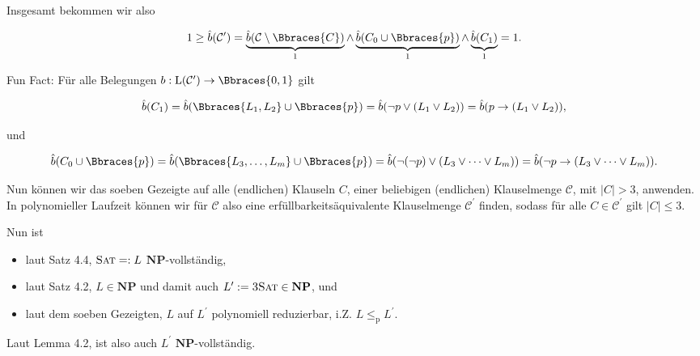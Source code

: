 \begin{solution}
\begin{enumerate}[label = \arabic*.]
\end{enumerate}

Insgesamt bekommen wir also

\begin{align*}
    1
    \geq
    \hat b(\mathcal C^\prime)
    =
    \underbrace{\hat b(\mathcal C \setminus \Bbraces{C})}_1
    \land
    \underbrace{\hat b(C_0 \cup \Bbraces{p})}_1
    \land
    \underbrace{\hat b(C_1)}_1
    =
    1.
\end{align*}

Fun Fact:
Für alle Belegungen $b: \operatorname L(\mathcal C^\prime) \to \Bbraces{0, 1}$ gilt

\begin{align*}
    \hat b(C_1)
    =
    \hat b(\Bbraces{L_1, L_2} \cup \Bbraces{p})
    =
    \hat b(\neg p \lor (L_1 \lor L_2))
    =
    \hat b(p \to (L_1 \lor L_2)),
\end{align*}

und

\begin{align*}
    \hat b(C_0 \cup \Bbraces{p})
    =
    \hat b(\Bbraces{L_3, \dots, L_m} \cup \Bbraces{p})
    =
    \hat b(\neg (\neg p) \lor (L_3 \lor \dots \lor L_m))
    =
    \hat b(\neg p \to (L_3 \lor \dots \lor L_m)).
\end{align*}

Nun können wir das soeben Gezeigte auf alle (endlichen) Klauseln $C$, einer beliebigen (endlichen) Klauselmenge $\mathcal C$, mit $|C| > 3$, anwenden.
In polynomieller Laufzeit können wir für $\mathcal C$ also eine erfüllbarkeitsäquivalente Klauselmenge $\mathcal C^\prime$ finden, sodass für alle $C \in \mathcal C^\prime$ gilt $|C| \leq 3$.

Nun ist

\begin{itemize}
    \item laut Satz 4.4, $\textsc{Sat} =: L$ $\mathbf{NP}$-vollständig,
    \item laut Satz 4.2, $L \in \mathbf{NP}$ und damit auch $L^\prime := \textsc{3Sat} \in \mathbf{NP}$, und
    \item laut dem soeben Gezeigten, $L$ auf $L^\prime$ polynomiell reduzierbar, i.Z. $L \leq_\mathrm{p} L^\prime$.
\end{itemize}

Laut Lemma 4.2, ist also auch $L^\prime$ $\mathbf{NP}$-vollständig.

\end{solution}

